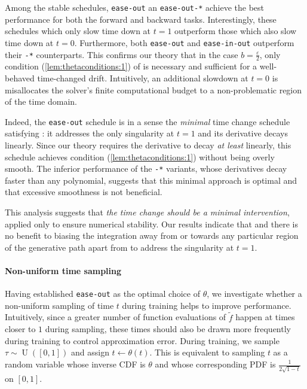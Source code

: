 Among the stable schedules, \texttt{ease-out} an \texttt{ease-out-*} achieve the best performance for both the forward and backward tasks. Interestingly, these schedules which only slow time down at \(t=1\) outperform those which also slow time down at \(t=0\). Furthermore, both \texttt{ease-out} and \texttt{ease-in-out} outperform their \texttt{-*} counterparts. This confirms our theory that in the case \(b = \frac{\varepsilon}{2}\), only condition (\ref{lem:thetaconditions:1}) of  is necessary and sufficient for a well-behaved time-changed drift.  Intuitively, an additional slowdown at \(t=0\) is misallocates the solver's finite computational budget to a non-problematic region of the time domain.

Indeed, the \texttt{ease-out} schedule is in a sense the \textit{minimal} time change schedule satisfying :  it addresses the only singularity at \(t=1\) and its derivative decays linearly. Since our theory requires the derivative to decay \textit{at least} linearly, this schedule achieves condition (\ref{lem:thetaconditions:1}) without being overly smooth. The inferior performance of the \texttt{-*} variants, whose derivatives decay faster than any polynomial, suggests that this minimal approach is optimal and that excessive smoothness is not beneficial.

This analysis suggests that \textit{the time change should be a minimal intervention}, applied only to ensure numerical stability. Our results indicate that and there is no benefit to biasing the integration away from or towards any particular region of the generative path apart from to address the singularity at \(t=1\).

\paragraph{Non-uniform time sampling}
Having established \texttt{ease-out} as the optimal choice of \(\theta\), we investigate whether a non-uniform sampling of time \(t\) during training helps to improve performance. Intuitively, since a greater number of function evaluations of \(\widetilde{f}\) happen at times closer to \(1\) during sampling, these times should also be drawn more frequently during training to control approximation error. During training, we sample \(\tau \sim \operatorname{U}([0, 1])\) and assign \(t \leftarrow \theta(t)\). This is equivalent to sampling \(t\) as a random variable whose inverse CDF is \(\theta\) and whose corresponding PDF is \(\frac{1}{2\sqrt{1-t}}\) on \([0, 1]\).

